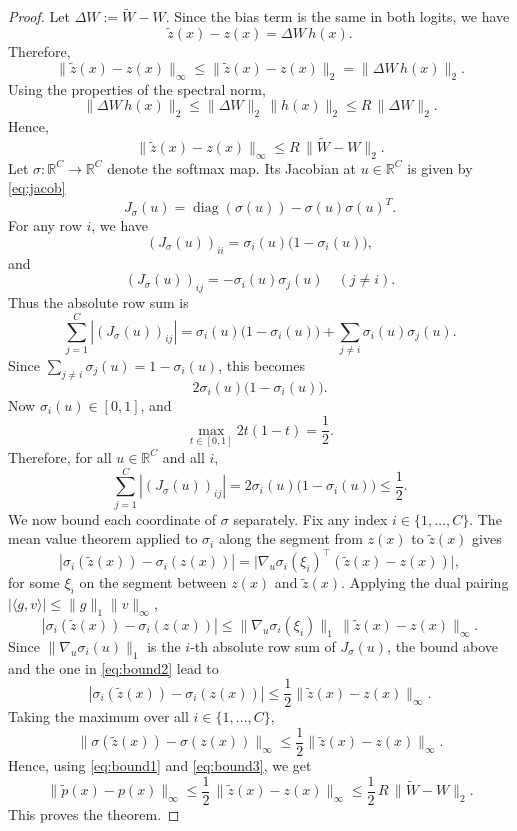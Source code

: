 \documentclass[twoside,leqno,onecolumn]{article}
\begin{document}
\begin{proof}
Let $\Delta W := \widetilde{W} - W$. Since the bias term is the same in both logits, we have
\[
\widetilde{z}(x) - z(x) = \Delta W \, h(x).
\]
Therefore,
\[
\|\widetilde{z}(x) - z(x)\|_\infty
\le
\|\widetilde{z}(x) - z(x)\|_2
=
\|\Delta W \, h(x)\|_2.
\]
Using the properties of the spectral norm,
\[
\|\Delta W \, h(x)\|_2
\le
\|\Delta W\|_2 \, \|h(x)\|_2
\le
R \, \|\Delta W\|_2.
\]
Hence,
\begin{equation}
\|\widetilde{z}(x) - z(x)\|_\infty
\le
R \, \|\widetilde{W} - W\|_2.\label{eq:bound1}
\end{equation}
Let $\sigma:\mathbb{R}^C \to \mathbb{R}^C$ denote the softmax map. Its Jacobian at $u \in \mathbb{R}^C$ is given by \eqref{eq:jacob}
\[
J_\sigma(u) = \operatorname{diag}(\sigma(u)) - \sigma(u)\sigma(u)^T.
\]
For any row $i$, we have
\[
(J_\sigma(u))_{ii} = \sigma_i(u)\bigl(1-\sigma_i(u)\bigr),
\]
and 
\[
(J_\sigma(u))_{ij} = -\sigma_i(u)\sigma_j(u)
\quad (j\neq i).
\]
Thus the absolute row sum is
\[
\sum_{j=1}^C |(J_\sigma(u))_{ij}|
=
\sigma_i(u)\bigl(1-\sigma_i(u)\bigr)
+
\sum_{j\neq i}\sigma_i(u)\sigma_j(u).
\]
Since $\sum_{j\neq i}\sigma_j(u)=1-\sigma_i(u)$, this becomes
\[
2\sigma_i(u)\bigl(1-\sigma_i(u)\bigr).
\]
Now $\sigma_i(u)\in[0,1]$, and
\[
\max_{t\in[0,1]} 2t(1-t)=\frac{1}{2}.
\]
Therefore, for all  $u\in\mathbb{R}^C$  and all  $i$,
\begin{equation}
\sum_{j=1}^C |(J_\sigma(u))_{ij}|
=
2\sigma_i(u)\bigl(1-\sigma_i(u)\bigr)
\le \frac{1}{2}. \label{eq:bound2}
\end{equation}
We now bound each coordinate of $\sigma$ separately. Fix any index $i\in\{1,\ldots,C\}$.
The mean value theorem \cite{rudin1976principles} applied to $\sigma_i$ along the segment from $z(x)$ to $\widetilde{z}(x)$ gives
\[
|\sigma_i(\widetilde{z}(x)) - \sigma_i(z(x))|
=
\bigl|\nabla_u \sigma_i(\xi_i)^\top (\widetilde{z}(x) - z(x))\bigr|,
\]
for some $\xi_i$ on the segment between $z(x)$ and $\widetilde{z}(x)$. Applying the dual
pairing $|\langle g,v\rangle| \le \|g\|_1\|v\|_\infty$,
\[
|\sigma_i(\widetilde{z}(x)) - \sigma_i(z(x))|
\le
\|\nabla_u \sigma_i(\xi_i)\|_1 \, \|\widetilde{z}(x) - z(x)\|_\infty.
\]
Since $\|\nabla_u \sigma_i(u)\|_1$ is the $i$-th absolute row sum of $J_\sigma(u)$, the bound above and the one in \eqref{eq:bound2} lead to
\[
|\sigma_i(\widetilde{z}(x)) - \sigma_i(z(x))|
\le
\frac{1}{2}\|\widetilde{z}(x) - z(x)\|_\infty.
\]
Taking the maximum over all $i\in\{1,\ldots,C\}$,
\begin{equation}
\|\sigma(\widetilde{z}(x)) - \sigma(z(x))\|_\infty
\le
\frac{1}{2}\|\widetilde{z}(x) - z(x)\|_\infty. \label{eq:bound3}
\end{equation}
Hence, using \eqref{eq:bound1} and \eqref{eq:bound3}, we get
\[
\|\widetilde{p}(x)-p(x)\|_\infty
\le
\frac{1}{2} \,\|\widetilde{z}(x)-z(x)\|_\infty
\le
\frac{1}{2} \, R \,\|\widetilde{W}-W\|_2.
\]
This proves the theorem.
\end{proof}
\end{document}
